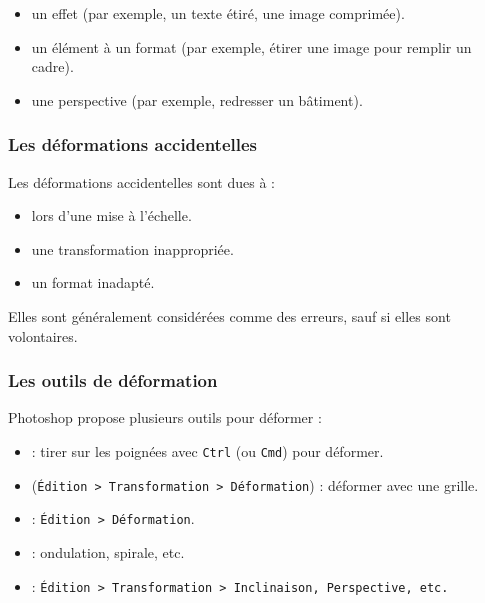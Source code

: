 \begin{itemize}
    \item {} un effet (par exemple, un texte étiré, une image comprimée).
    \item {} un élément à un format (par exemple, étirer une image pour remplir un cadre).
    \item {} une perspective (par exemple, redresser un bâtiment).
\end{itemize}

\subsubsection{Les déformations accidentelles}

Les déformations accidentelles sont dues à :

\begin{itemize}
    \item {} lors d'une mise à l'échelle.
    \item {} une transformation inappropriée.
    \item {} un format inadapté.
\end{itemize}

Elles sont généralement considérées comme des erreurs, sauf si elles sont volontaires.

\subsubsection{Les outils de déformation}

Photoshop propose plusieurs outils pour déformer :

\begin{itemize}
    \item {} : tirer sur les poignées avec \texttt{Ctrl} (ou \texttt{Cmd}) pour déformer.
    \item {} (\texttt{Édition > Transformation > Déformation}) : déformer avec une grille.
    \item {} : \texttt{Édition > Déformation}.
    \item {} : ondulation, spirale, etc.
    \item {} : \texttt{Édition > Transformation > Inclinaison, Perspective, etc.}
\end{itemize}

